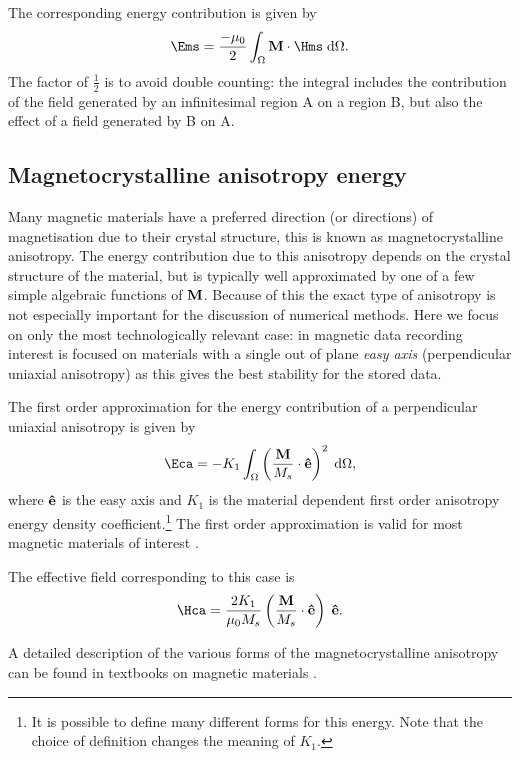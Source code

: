 The corresponding energy contribution is given by
\begin{equation}
  \label{eq:41}
  \Ems =  \frac{-\mu_0}{2} \int_{\magd} \Mv \cdot \Hms \d \magd.
\end{equation}
The factor of $\frac{1}{2}$ is to avoid double counting: the integral includes the contribution of the field generated by an infinitesimal region A on a region B, but also the effect of a field generated by B on A.

\subsection{Magnetocrystalline anisotropy energy}
\label{sec:magn-anis}

Many magnetic materials have a preferred direction (or directions) of magnetisation due to their crystal structure, this is known as magnetocrystalline anisotropy.
The energy contribution due to this anisotropy depends on the crystal structure of the material, but is typically well approximated by one of a few simple algebraic functions of $\boldsymbol{\mathrm{M}}$.
Because of this the exact type of anisotropy is not especially important for the discussion of numerical methods.
Here we focus on only the most technologically relevant case: in magnetic data recording interest is focused on materials with a single out of plane \emph{easy axis} (perpendicular uniaxial anisotropy) as this gives the best stability for the stored data.

The first order approximation for the energy contribution of a perpendicular uniaxial anisotropy is given by
\begin{equation}
  \Eca = -K_1 \int_\magd \left( \frac{\Mv}{M_s} \cdot \ev \right)^2 \d \magd,
  \label{eq:36}
\end{equation}
where $\boldsymbol{\mathrm{\hat{e}}}$ is the easy axis and $K_1$ is the material dependent first order anisotropy energy density coefficient.\footnote{It is possible to define many different forms for this energy. Note that the choice of definition changes the meaning of $K_1$.}
The first order approximation is valid for most magnetic materials of interest \cite{Coey2010}.

The effective field corresponding to this case is
\begin{equation}
  \Hca = \frac{2 K_1}{\mu_0 M_s} \left( \frac{\Mv}{M_s} \cdot \ev \right) \; \ev.
  \label{eq:Hca}
\end{equation}

A detailed description of the various forms of the magnetocrystalline anisotropy can be found in textbooks on magnetic materials \cite{Coey2010,Aharoni1996}.


